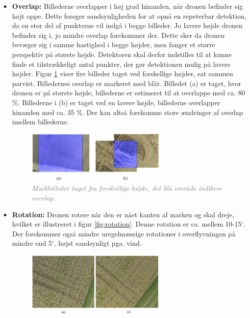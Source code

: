 \begin{itemize}
\item{\textbf{Overlap:} Billederne overlapper i høj grad hinanden, når dronen befinder sig højt oppe. Dette forøger sandsynligheden for at opnå en repeterbar detektion, da en stor del af punkterne vil indgå i begge billeder. Jo lavere højde dronen befinder sig i, jo mindre overlap forekommer der. Dette sker da dronen bevæger sig i samme hastighed i begge højder, men fanger et større perspektiv på største højde. Detektoren skal derfor indstilles til at kunne finde et tilstrækkeligt antal punkter, der gør detektionen mulig på lavere højder. Figur \ref{fig:overlap} viser fire billeder taget ved forskellige højder, sat sammen parvist. Billedernes overlap er markeret med blåt. Billedet (a) er taget, hvor dronen er på største højde, billederne er estimeret til at overlappe med ca. 80 $\%$. Billederne i (b) er taget ved en lavere højde, billederne overlapper hinanden med ca. 35 $\%$. Der kan altså forekomme store ændringer af overlap imellem billederne.
\begin{figure}[H]
    \centering
    \includegraphics[width=0.65\textwidth]{fig/17.png}
     \vspace{-1em}
    \begin{center}    
       \caption{\textcolor{gray}{\footnotesize \textit{Markbilleder taget fra forskellige højde, det blå område indikere overlap.}}}
    \label{fig:overlap}
     \end{center}
     \vspace{-2.5em}
  \end{figure} \noindent }
\item{\textbf{Rotation:} Dronen rotere når den er nået kanten af marken og skal dreje, hvilket er illustreret i figur \ref{fig:rotation}. Denne rotation er ca. mellem 10-15$^{\circ}$. Der forekommer også mindre uregelmæssige rotationer i overflyvningen på mindre end 5$^{\circ}$, højst sandsynligt pga. vind.
\begin{figure}[H]
    \centering
    \includegraphics[width=0.65\textwidth]{fig/19.png}

\end{figure}}
\end{itemize}
